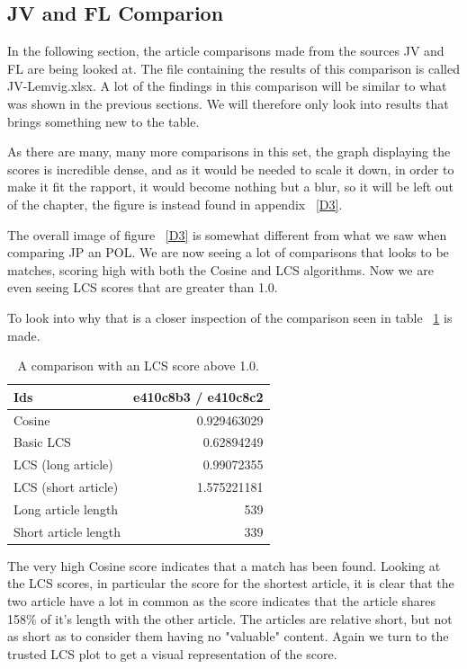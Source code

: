 \subsection{JV and FL Comparion}
In the following section, the article comparisons made from the sources JV and FL are being looked at. The file containing the results of this comparison is called JV-Lemvig.xlsx. A lot of the findings in this comparison will be similar to what was shown in the previous sections. We will therefore only look into results that brings something new to the table.

As there are many, many more comparisons in this set, the graph displaying the scores is incredible dense, and as it would be needed to scale it down, in order to make it fit the rapport, it would become nothing but a blur, so it will be left out of the chapter, the figure is instead found in appendix ~\ref{D3}.

The overall image of figure ~\ref{D3} is somewhat different from what we saw when comparing JP an POL. We are now seeing a lot of comparisons that looks to be matches, scoring high with both the Cosine and LCS algorithms. Now we are even seeing LCS scores that are greater than 1.0.

To look into why that is a closer inspection of the comparison seen in table ~\ref{JVFL100} is made.

\begin{table}
\begin{center}
	\begin{tabular}{l | r}
	Ids & e410c8b3 / e410c8c2\\ \hline
	Cosine & 0.929463029\\ \hline
	Basic LCS & 0.62894249\\ \hline
	LCS (long article) & 0.99072355\\ \hline
	LCS (short article) & 1.575221181\\ \hline
	Long article length & 539\\ \hline
	Short article length & 339\\ \hline	
	\end{tabular}
\end{center}
\caption{A comparison with an LCS score above 1.0.}
\label{JVFL100}
\end{table}

The very high Cosine score indicates that a match has been found. Looking at the LCS scores, in particular the score for the shortest article, it is clear that the two article have a lot in common as the score indicates that the article shares 158\% of it's length with the other article. The articles are relative short, but not as short as to consider them having no "valuable" content. Again we turn to the trusted LCS plot to get a visual representation of the score.

